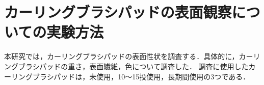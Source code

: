 \documentclass[main]{subfiles}
\begin{document}
\chapter{カーリングブラシパッドの表面観察についての実験方法}
本研究では，カーリングブラシパッドの表面性状を調査する．具体的に，カーリングブラシパッドの重さ，表面繊維，色について調査した．
調査に使用したカーリングブラシパッドは，未使用，10～15投使用，長期間使用の3つである．
\end{document}
